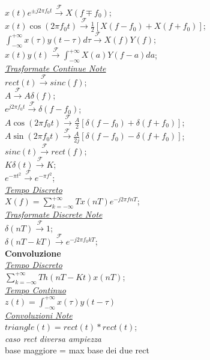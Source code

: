 \documentclass[a4paper]{article}
\begin{document}
\begin{multicols*}{3}
$x(t)e^{{\pm}j2{\pi}{f_0}t} \xrightarrow{\mathscr{F}} X(f{\mp}f_0)$; \\
$x(t)\cos(2{\pi}{f_0}t) \xrightarrow{\mathscr{F}} \frac{1}{2}[X(f - f_0) + X(f + f_0)]$; \\
$\int_{-\infty}^{+\infty}x(\tau)y(t - \tau) d\tau \xrightarrow{\mathscr{F}} X(f)Y(f)$; \\
$x(t)y(t) \xrightarrow{\mathscr{F}} \int_{-\infty}^{+\infty}X(a)Y(f - a) da$; \\
\underline{\textit{Trasformate Continue Note}} \\
$rect(t) \xrightarrow{\mathscr{F}} sinc(f)$; \\
$A \xrightarrow{\mathscr{F}} A\delta (f)$; \\
$e^{j2{\pi}f_{0}t} \xrightarrow{\mathscr{F}} \delta (f-f_0)$; \\
$A\cos(2{\pi}f_{0}t) \xrightarrow{\mathscr{F}} {\frac{A}{2}}[\delta(f-f_0) + \delta(f+f_0)]$; \\
$A\sin(2{\pi}f_{0}t) \xrightarrow{\mathscr{F}} {\frac{A}{2j}}[\delta(f-f_0) - \delta(f+f_0)]$; \\
$sinc(t) \xrightarrow{\mathscr{F}} rect(f)$; \\
$K\delta(t) \xrightarrow{\mathscr{F}} K$; \\
$e^{-\pi{t^2}} \xrightarrow{\mathscr{F}} e^{-\pi{f^2}}$; \\
\underline{\textit{Tempo Discreto}} \\
$X(f) = \sum_{k=-\infty}^{+\infty}{Tx(nT)e^{-j2\pi fnT}}$; \\
\underline{\textit{Trasformate Discrete Note}} \\
$\delta(nT) \xrightarrow{\mathscr{F}} 1$; \\
$\delta(nT - kT) \xrightarrow{\mathscr{F}} e^{-j2{\pi}{f_0}kT}$; \\
\textbf{Convoluzione} \\
\underline{\textit{Tempo Discreto}} \\
$\sum_{k=-\infty}^{+\infty}{Th(nT-Kt)x(nT)}$; \\
\underline{\textit{Tempo Continuo}} \\
$z (t)=\int_{-\infty}^{+\infty}{x(\tau)y(t-\tau)}$\\
\underline{\textit{Convoluzioni Note}} \\
$triangle(t) = rect(t) * rect(t)$; \\
\textit{caso rect diversa ampiezza} \\
base maggiore = max base dei due rect\\

\end{multicols*}
\end{document}
